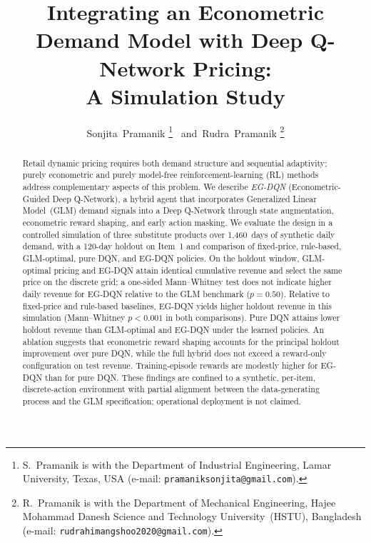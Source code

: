 \documentclass[journal, 10pt, twoside]{IEEEtran}
\begin{document}
\title{%
  Integrating an Econometric Demand Model with Deep Q-Network Pricing:\\
  A Simulation Study%
}

\author{%
  Sonjita~Pramanik%
  \thanks{S.~Pramanik is with the Department of Industrial Engineering,
    Lamar University, Texas, USA
    (e-mail: \texttt{pramaniksonjita@gmail.com}).}%
  ~and~Rudra~Pramanik%
  \thanks{R.~Pramanik is with the Department of Mechanical Engineering,
    Hajee Mohammad Danesh Science and Technology University~(HSTU),
    Bangladesh
    (e-mail: \texttt{rudrahimangshoo2020@gmail.com}).}%
}

\maketitle

\begin{abstract}
Retail dynamic pricing requires both demand structure and sequential
adaptivity; purely econometric and purely model-free reinforcement-learning
(RL) methods address complementary aspects of this problem.
We describe \textit{EG-DQN} (Econometric-Guided Deep Q-Network), a hybrid
agent that incorporates Generalized Linear Model~(GLM) demand signals into
a Deep Q-Network through state augmentation, econometric reward shaping,
and early action masking.
We evaluate the design in a controlled simulation of three substitute
products over 1{,}460~days of synthetic daily demand, with a 120-day
holdout on Item~1 and comparison of fixed-price, rule-based, GLM-optimal,
pure DQN, and EG-DQN policies.
On the holdout window, GLM-optimal pricing and EG-DQN attain identical
cumulative revenue and select the same price on the discrete grid; a
one-sided Mann--Whitney test does not indicate higher daily revenue for
EG-DQN relative to the GLM benchmark ($p=0.50$).
Relative to fixed-price and rule-based baselines, EG-DQN yields higher
holdout revenue in this simulation (Mann--Whitney $p<0.001$ in both
comparisons).
Pure DQN attains lower holdout revenue than GLM-optimal and EG-DQN under
the learned policies.
An ablation suggests that econometric reward shaping accounts for the
principal holdout improvement over pure DQN, while the full hybrid does
not exceed a reward-only configuration on test revenue.
Training-episode rewards are modestly higher for EG-DQN than for pure DQN.
These findings are confined to a synthetic, per-item, discrete-action
environment with partial alignment between the data-generating process
and the GLM specification; operational deployment is not claimed.
\end{abstract}
\end{document}
